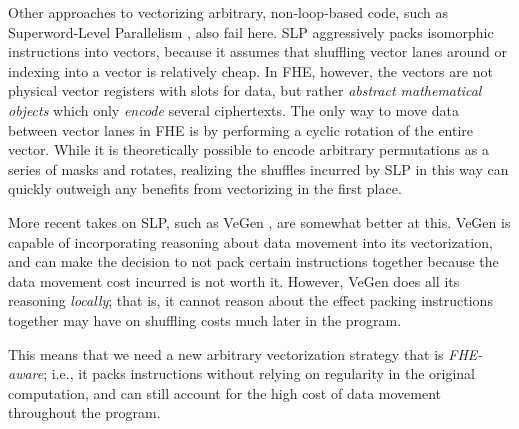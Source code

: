 
Other approaches to vectorizing arbitrary, non-loop-based code, such as Superword-Level Parallelism \cite{SLP}, also fail here.
SLP aggressively packs isomorphic instructions into vectors, because it assumes that shuffling vector lanes around or indexing into a vector is relatively cheap.
In FHE, however, the vectors are not physical vector registers with slots for data, but rather {\em abstract mathematical objects} which only {\em encode} several ciphertexts.
The only way to move data between vector lanes in FHE is by performing a cyclic rotation of the entire vector.
While it is theoretically possible to encode arbitrary permutations as a series of masks and rotates, realizing the shuffles incurred by SLP in this way can quickly outweigh any benefits from vectorizing in the first place.

More recent takes on SLP, such as VeGen \cite{VeGen}, are somewhat better at this.
VeGen is capable of incorporating reasoning about data movement into its vectorization, and can make the decision to not pack certain instructions together because the data movement cost incurred is not worth it.
However, VeGen does all its reasoning {\em locally}; that is, it cannot reason about the effect packing instructions together may have on shuffling costs much later in the program. 

This means that we need a new arbitrary vectorization strategy that is {\em FHE-aware}; i.e., it packs instructions without relying on regularity in the original computation, and can still account for the high cost of data movement throughout the program.


